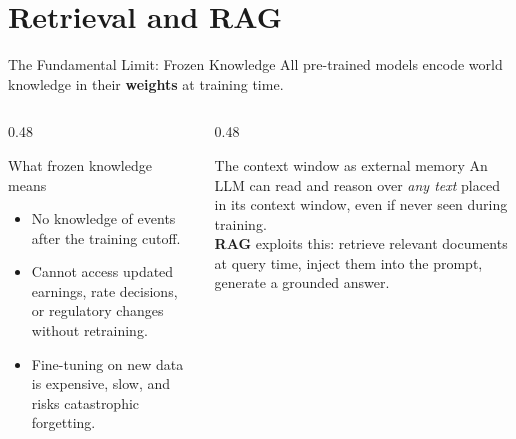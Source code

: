 \documentclass[11pt,aspectratio=169,professionalfonts]{beamer}
\begin{document}
\section{Retrieval and RAG}
%
\begin{frame}{The Fundamental Limit: Frozen Knowledge}
  All pre-trained models encode world knowledge in their \textbf{weights}
  at training time.

  \begin{columns}[T]
    \begin{column}{0.48\linewidth}
      \begin{alertblock}{What frozen knowledge means}
        \begin{itemize}
          \item No knowledge of events after the training cutoff.
          \item Cannot access updated earnings, rate decisions,
                or regulatory changes without retraining.
          \item Fine-tuning on new data is expensive, slow,
                and risks catastrophic forgetting.
        \end{itemize}
      \end{alertblock}
    \end{column}
    \begin{column}{0.48\linewidth}
      \begin{block}{The context window as external memory}
        An LLM can read and reason over \emph{any text}
        placed in its context window, even if never seen
        during training.\\[0.4em]
        \textbf{RAG} exploits this: retrieve relevant
        documents at query time, inject them into the prompt,
        generate a grounded answer.
      \end{block}
    \end{column}
  \end{columns}
\end{frame}
%
%
\end{document}
